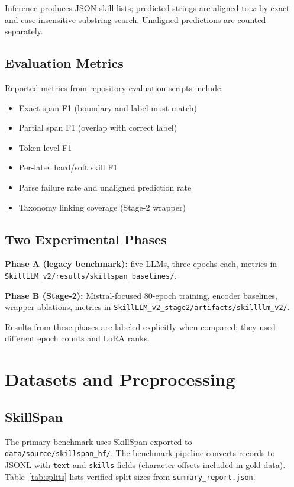 \documentclass[12pt,oneside]{report}
\begin{document}
Inference produces JSON skill lists; predicted strings are aligned to $x$ by exact and case-insensitive substring search.
Unaligned predictions are counted separately.

\section{Evaluation Metrics}

Reported metrics from repository evaluation scripts include:
\begin{itemize}
  \item Exact span F1 (boundary and label must match)
  \item Partial span F1 (overlap with correct label)
  \item Token-level F1
  \item Per-label hard/soft skill F1
  \item Parse failure rate and unaligned prediction rate
  \item Taxonomy linking coverage (Stage-2 wrapper)
\end{itemize}

\section{Two Experimental Phases}

\textbf{Phase A (legacy benchmark):} five LLMs, three epochs each, metrics in \texttt{SkillLLM\_v2/results/skillspan\_baselines/}.

\textbf{Phase B (Stage-2):} Mistral-focused 80-epoch training, encoder baselines, wrapper ablations, metrics in \texttt{SkillLLM\_v2\_stage2/artifacts/skillllm\_v2/}.

Results from these phases are labeled explicitly when compared; they used different epoch counts and LoRA ranks.

\chapter{Datasets and Preprocessing}
\label{ch:data}

\section{SkillSpan}

The primary benchmark uses SkillSpan exported to \texttt{data/source/skillspan\_hf/}.
The benchmark pipeline converts records to JSONL with \texttt{text} and \texttt{skills} fields (character offsets included in gold data).
Table~\ref{tab:splits} lists verified split sizes from \texttt{summary\_report.json}.
\end{document}
